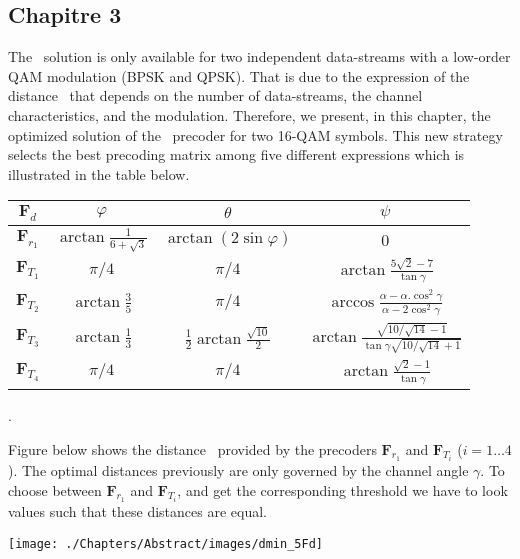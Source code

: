 \subsection*{Chapitre 3}
The \maxdmin\ solution is only available for two independent data-streams with a low-order QAM modulation (BPSK and QPSK). That is due to the expression of the distance \dmin\ that depends on the number of data-streams, the channel characteristics, and the modulation. Therefore, we present, in this chapter, the optimized solution of the \maxdmin\ precoder for two 16-QAM symbols. This new strategy selects the best precoding matrix among five different expressions which is illustrated in the table below. 
\begin{center}
\small
\begin{tabular}{c|c|c|c}
	\hline
	$\mathbf{F}_{d}$ & $\varphi$ & $\theta$ & $\psi$ \\
	\hline
	$\mathbf{F}_{r_1}$ & $\arctan \frac{1}{6+\sqrt{3}}$ & $\arctan (2\sin \varphi)$ & 0 \\
	$\mathbf{F}_{T_1}$ & $\pi /4$ & $\pi /4$ & $\arctan \frac{5\sqrt{2}-7}{\tan\gamma}$ \\
	$\mathbf{F}_{T_2}$ & $\arctan \frac{3}{5}$ & $\pi /4$ & $\arccos \frac{\alpha-\alpha.\cos^2\gamma}{\alpha-2\cos^2\gamma}$ \\
	$\mathbf{F}_{T_3}$ & $\arctan \frac{1}{3}$ & $\frac{1}{2} \arctan \frac{\sqrt{10}}{2}$ & $ \arctan \frac{\sqrt{10/\sqrt{14}-1}} {\tan\gamma \sqrt{10/\sqrt{14}+1}}$ \\
	$\mathbf{F}_{T_4}$ & $\pi /4$ & $\pi /4$ & $\arctan \frac{\sqrt{2}-1}{\tan \gamma}$ \\
	\hline
\end{tabular}

.
\end{center}

Figure below shows the distance \dmin\ provided by the precoders $\mathbf{F}_{r_1}$ and $\mathbf{F}_{T_i}$ ($i=1\hdots4$). The optimal distances previously are only governed by the channel angle $\gamma$. To choose between $\mathbf{F}_{r_1}$ and $\mathbf{F}_{T_i}$, and get the corresponding threshold we have to look values such that these distances are equal. 
\begin{center} 
	\texttt{[image: ./Chapters/Abstract/images/dmin\_5Fd]}
\end{center}


